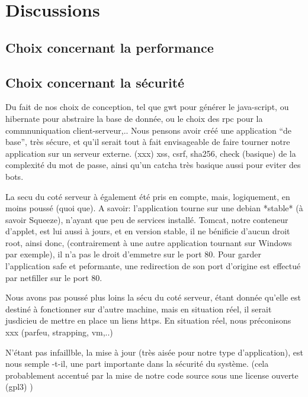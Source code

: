 \section{Discussions}
\subsection{Choix concernant la performance}
\subsection{Choix concernant la sécurité}

Du fait de nos choix de conception, tel que gwt pour générer le java-script, ou
hibernate pour abstraire la base de donnée, ou le choix des rpc pour la
commnuniquation client-serveur,..  Nous pensons avoir créé une application ``de
base'', très sécure, et qu'il serait tout à fait envisageable de faire tourner notre
application sur un serveur externe.
(xxx) xss, csrf, sha256, check (basique) de la complexité du mot de passe, ainsi
qu'un catcha très basique aussi pour eviter des bots.

La secu du coté serveur à également été pris en compte, mais, logiquement, en
moins poussé (quoi que).  A savoir: l'application tourne sur une debian *stable*
(à savoir Squeeze), n'ayant que peu de services installé.
Tomcat, notre conteneur d'applet, est lui aussi à jours, et en version stable,
il ne bénificie d'aucun droit root, ainsi donc, (contrairement à une autre
application tournant sur Windows par exemple), il n'a pas le droit d'emmetre sur
le port 80. Pour garder l'application safe et peformante, une redirection de
son port d'origine est effectué par netfiller sur le port 80.

Nous avons pas poussé plus loins la sécu du coté serveur, étant donnée qu'elle
est destiné à fonctionner sur d'autre machine, mais en situation réel, il serait
jusdicieu de mettre en place un liens https.  En situation réel, nous
préconisons xxx (parfeu, strapping, vm,..)

N'étant pas infaillble, la mise à jour (très aisée pour notre type
d'application), est nous semple -t-il, une part importante dans la sécurité du
système. (cela probablement accentué par la mise de notre code source sous une
license ouverte (gpl3) )
